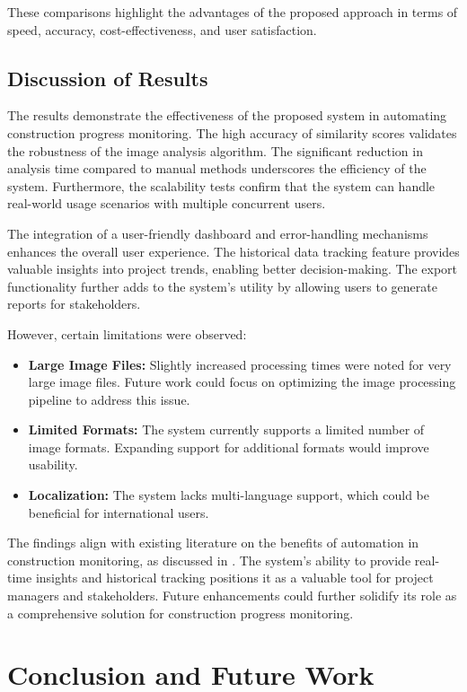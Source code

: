 These comparisons highlight the advantages of the proposed approach in terms of speed, accuracy, cost-effectiveness, and user satisfaction.

\section{Discussion of Results}
The results demonstrate the effectiveness of the proposed system in automating construction progress monitoring. The high accuracy of similarity scores validates the robustness of the image analysis algorithm. The significant reduction in analysis time compared to manual methods underscores the efficiency of the system. Furthermore, the scalability tests confirm that the system can handle real-world usage scenarios with multiple concurrent users.

The integration of a user-friendly dashboard and error-handling mechanisms enhances the overall user experience. The historical data tracking feature provides valuable insights into project trends, enabling better decision-making. The export functionality further adds to the system's utility by allowing users to generate reports for stakeholders.

However, certain limitations were observed:
\begin{itemize}
    \item \textbf{Large Image Files:} Slightly increased processing times were noted for very large image files. Future work could focus on optimizing the image processing pipeline to address this issue.
    \item \textbf{Limited Formats:} The system currently supports a limited number of image formats. Expanding support for additional formats would improve usability.
    \item \textbf{Localization:} The system lacks multi-language support, which could be beneficial for international users.
\end{itemize}

The findings align with existing literature on the benefits of automation in construction monitoring, as discussed in \cite{Sample2023}. The system's ability to provide real-time insights and historical tracking positions it as a valuable tool for project managers and stakeholders. Future enhancements could further solidify its role as a comprehensive solution for construction progress monitoring.

\chapter{Conclusion and Future Work}

